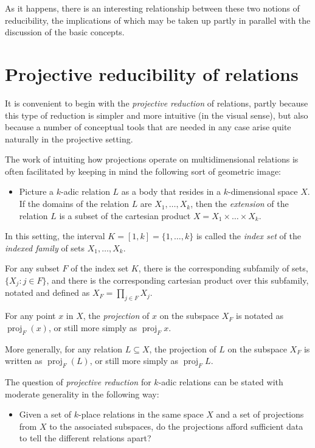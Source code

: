 \documentclass[12pt]{article}
\begin{document}
As it happens, there is an interesting relationship between these two notions of reducibility, the implications of which may be taken up partly in parallel with the discussion of the basic concepts.

\section{Projective reducibility of relations}

It is convenient to begin with the \textit{projective reduction} of relations, partly because this type of reduction is simpler and more intuitive (in the visual sense), but also because a number of conceptual tools that are needed in any case arise quite naturally in the projective setting.

The work of intuiting how projections operate on multidimensional relations is often facilitated by keeping in mind the following sort of geometric image:

\begin{itemize}
\item
Picture a $k$-adic relation $L$ as a body that resides in a $k$-dimensional space $X$.  If the domains of the relation $L$ are $X_1, \ldots, X_k$, then the \textit{extension} of the relation $L$ is a subset of the cartesian product $X = X_1 \times \ldots \times X_k$.
\end{itemize}

In this setting, the interval $K = [1, k] = \{ 1, \ldots, k \}$ is called the \textit{index set} of the \textit{indexed family} of sets $X_1, \ldots, X_k$.

For any subset $F$ of the index set $K$, there is the corresponding subfamily of sets, $\{ X_j : j \in F \}$, and there is the corresponding cartesian product over this subfamily, notated and defined as $X_F = \prod_{j \in F} X_j$.

For any point $x$ in $X$, the \textit{projection} of $x$ on the subspace $X_F$ is notated as $\operatorname{proj}_{F}(x)$, or still more simply as $\operatorname{proj}_{F}x.$

More generally, for any relation $L \subseteq X$, the projection of $L$ on the subspace $X_F$ is written as $\operatorname{proj}_{F}(L)$, or still more simply as $\operatorname{proj}_{F}L.$

The question of \textit{projective reduction} for $k$-adic relations can be stated with moderate generality in the following way:

\begin{itemize}
\item
Given a set of $k$-place relations in the same space $X$ and a set of projections from $X$ to the associated subspaces, do the projections afford sufficient data to tell the different relations apart?
\end{itemize}
\end{document}

